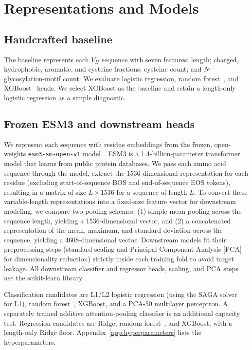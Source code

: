 \section{Representations and Models}
\label{sec:methods}

\subsection{Handcrafted baseline}

The baseline represents each $V_H$ sequence with seven features: length;
charged, hydrophobic, aromatic, and cysteine fractions; cysteine count; and
$N$-glycosylation-motif count. We evaluate logistic regression, random
forest~\cite{breiman2001random}, and XGBoost~\cite{chen2016xgboost} heads.
We select XGBoost as the baseline and retain a length-only logistic regression
as a simple diagnostic.

\subsection{Frozen ESM3 and downstream heads}

We represent each sequence with residue embeddings from the frozen, open-weights
\texttt{esm3-sm-open-v1}
model~\cite{evolutionaryscale2024esm3open}. ESM3 is a 1.4-billion-parameter
transformer model that learns from public protein databases. We pass each amino acid
sequence through the model, extract the 1536-dimensional representation for each
residue (excluding start-of-sequence BOS and end-of-sequence EOS tokens),
resulting in a matrix of size $L \times 1536$ for a sequence of length $L$. To
convert these variable-length representations into a fixed-size feature vector
for downstream modeling, we compare two pooling schemes: (1) simple mean pooling
across the sequence length, yielding a 1536-dimensional vector, and (2) a
concatenated representation of the mean, maximum, and standard deviation across
the sequence, yielding a 4608-dimensional vector. Downstream models fit their
preprocessing steps (standard scaling and Principal Component Analysis [PCA] for
dimensionality reduction) strictly inside each training fold to avoid target
leakage. All downstream classifier and regressor heads, scaling, and PCA steps
use the scikit-learn library~\cite{scikit-learn}.

Classification candidates are L1/L2 logistic regression (using the SAGA
solver~\cite{defazio2014saga} for L1), random forest~\cite{breiman2001random},
XGBoost, and a PCA-50 multilayer perceptron. A separately trained additive
attention-pooling classifier is an additional capacity test. Regression
candidates are Ridge, random forest~\cite{breiman2001random}, and XGBoost, with
a length-only Ridge floor. Appendix~\ref{app:hyperparameters} lists the
hyperparameters.

